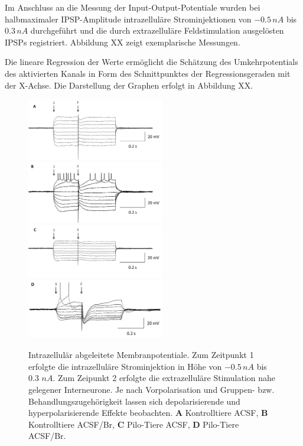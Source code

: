 \documentclass[a4paper,11pt]{report}
\begin{document}
{Im Anschluss an die Messung der Input-Output-Potentiale wurden bei halbmaximaler IPSP-Amplitude intrazelluläre Strominjektionen von $-0.5\, nA$ bis $0.3\, nA$ durchgeführt und die durch extrazelluläre Feldstimulation ausgelösten IPSPs registriert. Abbildung XX zeigt exemplarische Messungen.\

Die lineare Regression der Werte ermöglicht die Schätzung des Umkehrpotentials des aktivierten Kanals in Form des Schnittpunktes der Regressionsgeraden mit der X-Achse. Die Darstellung der Graphen erfolgt in Abbildung XX.\\

\begin{figure} [H]
\begin{center}
\includegraphics[width=6cm]{Abbildungen/egaba/egaba_k_c_sample}
\includegraphics[width=6cm]{Abbildungen/egaba/egaba_k_br_sample}
\includegraphics[width=6cm]{Abbildungen/egaba/egaba_p_c_sample}
\includegraphics[width=6cm]{Abbildungen/egaba/egaba_p_br_sample}
\caption{Intrazellulär abgeleitete Membranpotentiale. Zum Zeitpunkt 1 erfolgte die intrazelluläre Strominjektion in Höhe von $-0.5\, nA$ bis $0.3$ $nA$. Zum Zeipunkt 2 erfolgte die extrazelluläre Stimulation nahe gelegener Interneurone. Je nach Vorpolarisation und Gruppen- bzw. Behandlungszugehörigkeit lassen sich depolarisierende und hyperpolarisierende Effekte beobachten. \textbf{A} Kontrolltiere ACSF, \textbf{B} Kontrolltiere ACSF/Br, \textbf{C} Pilo-Tiere ACSF, \textbf{D} Pilo-Tiere ACSF/Br.}
\end{center}
\end{figure}

}
\end{document}
